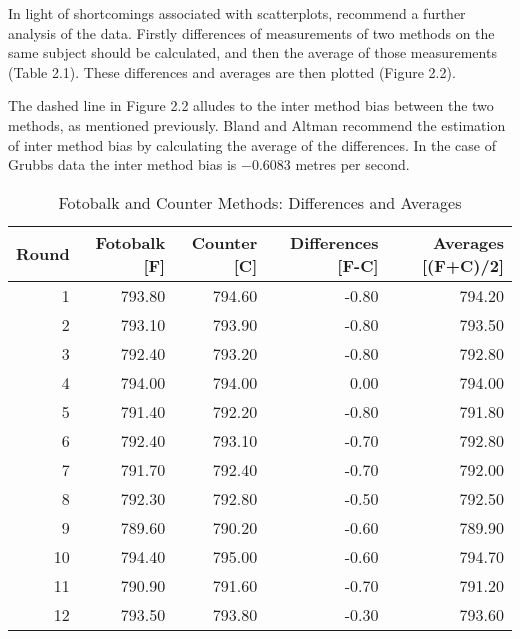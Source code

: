\documentclass{report}
\begin{document}
In light of shortcomings associated with scatterplots,
\citet*{BA83} recommend a further analysis of the data. Firstly
differences of measurements of two methods on the same subject
should  be calculated, and then the average of those measurements
(Table 2.1). These differences and averages are then plotted
(Figure 2.2).




The dashed line in Figure 2.2 alludes to the inter method bias
between the two methods, as mentioned previously. Bland and Altman
recommend the estimation of inter method bias by calculating the
average of the differences. In the case of Grubbs data the inter
method bias is $-0.6083$ metres per second.
\newpage

\begin{table}[tbh]
	\begin{center}
		
		\begin{tabular}{rrrrr}
			\hline
			Round & Fotobalk [F] & Counter [C] & Differences [F-C] & Averages [(F+C)/2] \\
			\hline
			1 & 793.80 & 794.60 & -0.80 & 794.20 \\
			2 & 793.10 & 793.90 & -0.80 & 793.50 \\
			3 & 792.40 & 793.20 & -0.80 & 792.80 \\
			4 & 794.00 & 794.00 & 0.00 & 794.00 \\
			5 & 791.40 & 792.20 & -0.80 & 791.80 \\
			6 & 792.40 & 793.10 & -0.70 & 792.80 \\
			7 & 791.70 & 792.40 & -0.70 & 792.00 \\
			8 & 792.30 & 792.80 & -0.50 & 792.50 \\
			9 & 789.60 & 790.20 & -0.60 & 789.90 \\
			10 & 794.40 & 795.00 & -0.60 & 794.70 \\
			11 & 790.90 & 791.60 & -0.70 & 791.20 \\
			12 & 793.50 & 793.80 & -0.30 & 793.60 \\
			\hline
		\end{tabular}
		\caption{Fotobalk and Counter Methods: Differences and Averages}
	\end{center}
\end{table}


\end{document}
